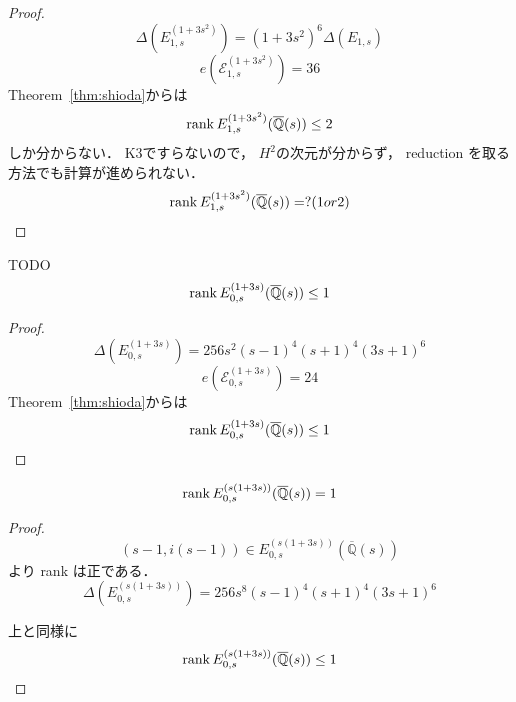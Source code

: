\documentclass[main]{subfiles}
\begin{document}
\begin{proof}
    \begin{equation}
        \Delta(E_{1,s}^{(1 + 3s^{2})}) = (1 + 3s^{2})^{6} \Delta(E_{1,s})
    \end{equation}
    \begin{equation}
        e(\mathcal{E}_{1,s}^{(1 + 3s^{2})}) = 36
    \end{equation}
    Theorem~\ref{thm:shioda}からは
    \begin{equation}
        \operatorname{rank} E_{1,s}^{(1 + 3s^{2})}(\overline{\mathbb{Q}}(s)) \leq 2
    \end{equation}
    しか分からない．
    K3ですらないので， $H^2$の次元が分からず， reduction を取る方法でも計算が進められない．
    \begin{equation}
        \operatorname{rank} E_{1,s}^{(1 + 3s^{2})}(\overline{\mathbb{Q}}(s)) = ? (1 or 2)
    \end{equation}
\end{proof}


\begin{thm}
    TODO
    \begin{equation}
        \operatorname{rank} E_{0,s}^{(1 + 3s)}(\overline{\mathbb{Q}}(s)) \leq 1
    \end{equation}
\end{thm}
\begin{proof}
    \begin{equation}
        \Delta(E_{0,s}^{(1 + 3s)}) = 256s^{2}(s - 1)^{4}(s + 1)^{4}(3s + 1)^{6}
    \end{equation}
    \begin{equation}
        e(\mathcal{E}_{0,s}^{(1 + 3s)}) = 24
    \end{equation}
    Theorem~\ref{thm:shioda}からは
    \begin{equation}
        \operatorname{rank} E_{0,s}^{(1 + 3s)}(\overline{\mathbb{Q}}(s)) \leq 1
    \end{equation}
\end{proof}

\begin{thm}
    \begin{equation}
        \operatorname{rank} E_{0,s}^{(s(1 + 3s))}(\overline{\mathbb{Q}}(s)) = 1
    \end{equation}
\end{thm}
\begin{proof}
    \begin{equation}
        (s - 1, i(s - 1)) \in E_{0,s}^{(s(1 + 3s))}(\overline{\mathbb{Q}}(s))
    \end{equation}
    より rank は正である．
    \begin{equation}
        \Delta(E_{0,s}^{(s(1 + 3s))}) = 256s^{8}(s - 1)^{4}(s + 1)^{4}(3s + 1)^{6}
    \end{equation}
    
    上と同様に
    \begin{equation}
        \operatorname{rank} E_{0,s}^{(s(1 + 3s))}(\overline{\mathbb{Q}}(s)) \leq 1
    \end{equation}
\end{proof}
\end{document}
